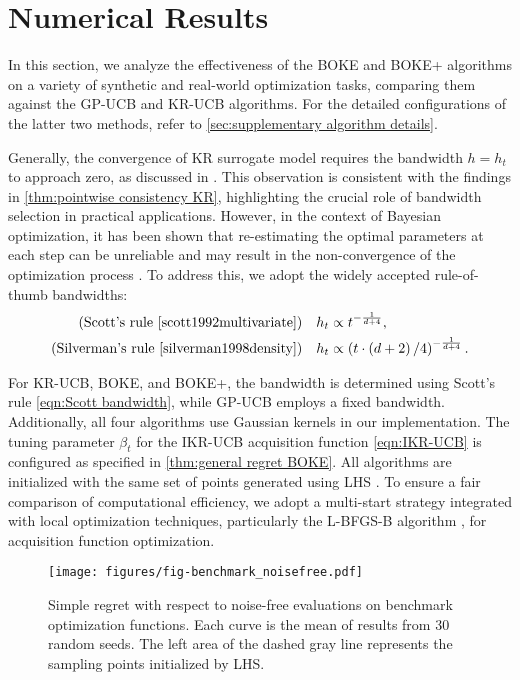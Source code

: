 \documentclass[11pt,en]{elegantpaper}
\newcommand{\1}{\mathds{1}}
\begin{document}
\section{Numerical Results}
\label{sec:experiments}

In this section, we analyze the effectiveness of the BOKE and BOKE+ algorithms on a variety of synthetic and real-world optimization tasks, comparing them against the GP-UCB and KR-UCB algorithms. For the detailed configurations of the latter two methods, refer to \cref{sec:supplementary algorithm details}.

Generally, the convergence of KR surrogate model requires the bandwidth $h = h_t$ to approach zero, as discussed in \cite{linke2023towards}.
This observation is consistent with the findings in \cref{thm:pointwise consistency KR}, highlighting the crucial role of bandwidth selection in practical applications.
However, in the context of Bayesian optimization, it has been shown that re-estimating the optimal parameters at each step can be unreliable and may result in the non-convergence of the optimization process \cite{bull2011convergence}.
To address this, we adopt the widely accepted rule-of-thumb bandwidths:
\begin{align}
    \text{(Scott's rule \cite{scott1992multivariate})}
    & \quad h_t \propto t^{-\frac{1}{d+4}},
    \label{eqn:Scott bandwidth} 
    \\
    \text{(Silverman's rule \cite{silverman1998density})}
    & \quad h_t \propto \left(t \cdot \left(d + 2\right) / 4\right)^{-\frac{1}{d+4}}.
    \label{eqn:Silverman bandwidth}
\end{align}



For KR-UCB, BOKE, and BOKE+, the bandwidth is determined using Scott's rule \eqref{eqn:Scott bandwidth}, while GP-UCB employs a fixed bandwidth.
Additionally, all four algorithms use Gaussian kernels in our implementation.
The tuning parameter $\beta_t$ for the IKR-UCB acquisition function \eqref{eqn:IKR-UCB} is configured as specified in \cref{thm:general regret BOKE}.
All algorithms are initialized with the same set of points generated using LHS \cite{mckay1979comparison}.
To ensure a fair comparison of computational efficiency, we adopt a multi-start strategy integrated with local optimization techniques, particularly the L-BFGS-B algorithm \cite{byrd1995limited}, for acquisition function optimization.

\begin{figure}[!htb]
    \centering
    \texttt{[image: figures/fig-benchmark\_noisefree.pdf]}
    \caption{
        Simple regret with respect to noise-free evaluations on benchmark optimization functions.
        Each curve is the mean of results from 30 random seeds.
        The left area of the dashed gray line represents the sampling points initialized by LHS.
    }
    \label{fig:benchmark noisefree}
\end{figure}
\end{document}
